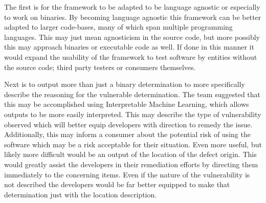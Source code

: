 \documentclass[]{article}
\begin{document}
The first is for the framework to be adapted to be language agnostic or especially to work on binaries.
By becoming language agnostic this framework can be better adapted to larger code-bases, many of which span multiple programming languages. 
This may just mean agnosticism in the source code, but more possibly this may approach binaries or executable code as well.
If done in this manner it would expand the usability of the framework to test software by entities without the source code; third party testers or consumers themselves.

Next is to output more than just a binary determination to more specifically describe the reasoning for the vulnerable determination.
The team suggested that this may be accomplished using Interpretable Machine Learning, which allows outputs to be more easily interpreted.
This may describe the type of vulnerability observed which will better equip developers with direction to remedy the issue.
Additionally, this may inform a consumer about the potential risk of using the software which may be a risk acceptable for their situation.
Even more useful, but likely more difficult would be an output of the location of the defect origin.
This would greatly assist the developers in their remediation efforts by directing them immediately to the concerning items.
Even if the nature of the vulnerability is not described the developers would be far better equipped to make that determination just with the location description.


\clearpage


\end{document}
